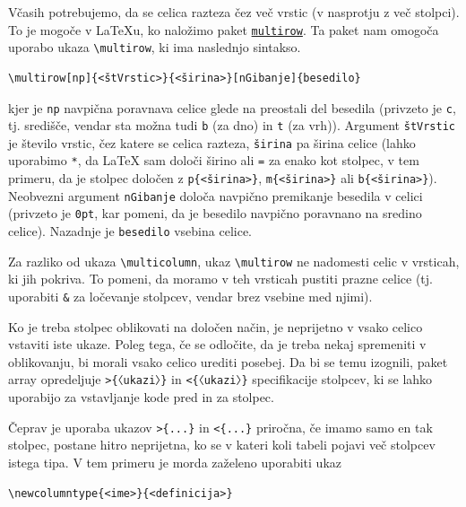 Včasih potrebujemo, da se celica razteza čez več vrstic (v nasprotju z več stolpci). To je mogoče v LaTeXu, ko naložimo paket \href{https://ctan.org/pkg/multirow?lang=en}{\texttt{multirow}}.
Ta paket nam omogoča uporabo ukaza \texttt{{\textbackslash}multirow}, ki ima naslednjo sintakso.

\begin{verbatim}
\multirow[np]{<štVrstic>}{<širina>}[nGibanje]{besedilo}
\end{verbatim}

kjer je \texttt{np} navpična poravnava celice glede na preostali del besedila (privzeto je \texttt{c}, tj. središče, vendar sta možna tudi \texttt{b} (za dno) in \texttt{t} (za vrh)).
Argument \texttt{štVrstic} je število vrstic, čez katere se celica razteza, \texttt{širina} pa širina celice (lahko uporabimo \texttt{*}, da LaTeX sam določi širino ali \texttt{=} za enako kot stolpec, v tem primeru, da je stolpec določen z \texttt{p\{\textless širina\textgreater \}}, \texttt{m\{\textless širina\textgreater \}} ali \texttt{b\{\textless širina\textgreater \}}).
Neobvezni argument \texttt{nGibanje} določa navpično premikanje besedila v celici (privzeto je \texttt{0pt}, kar pomeni, da je besedilo navpično poravnano na sredino celice).
Nazadnje je \texttt{besedilo} vsebina celice.

Za razliko od ukaza \texttt{{\textbackslash}multicolumn}, ukaz \texttt{{\textbackslash}multirow} ne nadomesti celic v vrsticah, ki jih pokriva.
To pomeni, da moramo v teh vrsticah pustiti prazne celice (tj. uporabiti \texttt{\&} za ločevanje stolpcev, vendar brez vsebine med njimi).

Ko je treba stolpec oblikovati na določen način, je neprijetno v vsako celico vstaviti iste ukaze.
Poleg tega, če se odločite, da je treba nekaj spremeniti v oblikovanju, bi morali vsako celico urediti posebej.
Da bi se temu izognili, paket array
opredeljuje \texttt{\textgreater \{〈ukazi〉\}} in \texttt{\textless \{〈ukazi〉\}} specifikacije stolpcev, ki se lahko uporabijo
za vstavljanje kode pred in za stolpec.

\begin{example}\label{eg_tables_cmdcols}\end{example}Čeprav je uporaba ukazov \texttt{\textgreater \{...\}} in \texttt{\textless \{...\}} priročna, če imamo samo en tak stolpec, postane hitro neprijetna, ko se v kateri koli tabeli pojavi več stolpcev istega tipa.
V tem primeru je morda zaželeno uporabiti ukaz

\begin{verbatim}
\newcolumntype{<ime>}{<definicija>}
\end{verbatim}

